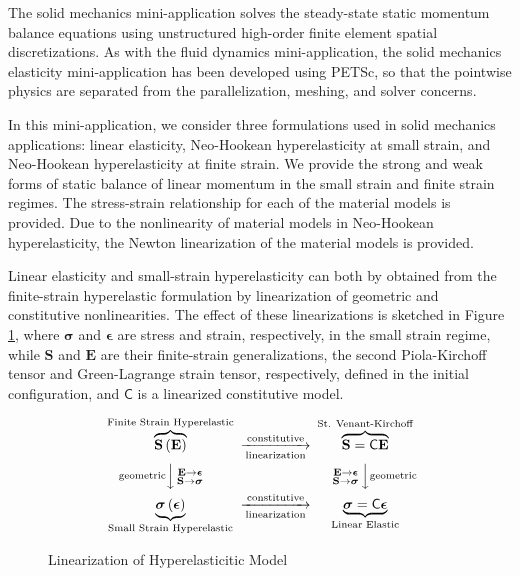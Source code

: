The solid mechanics mini-application solves the steady-state static momentum balance equations using unstructured high-order finite element spatial discretizations.
As with the fluid dynamics mini-application, the solid mechanics elasticity mini-application has been developed using PETSc, so that the pointwise physics are separated from the parallelization, meshing, and solver concerns.

In this mini-application, we consider three formulations used in solid mechanics applications: linear elasticity, Neo-Hookean hyperelasticity at small strain, and Neo-Hookean hyperelasticity at finite strain.
We provide the strong and weak forms of static balance of linear momentum in the small strain and finite strain regimes.
The stress-strain relationship for each of the material models is provided.
Due to the nonlinearity of material models in Neo-Hookean hyperelasticity, the Newton linearization of the material models is provided.

Linear elasticity and small-strain hyperelasticity can both by obtained from the finite-strain hyperelastic formulation by linearization of geometric and constitutive nonlinearities.
The effect of these linearizations is sketched in Figure \ref{fig:hyperelastic-cd}, where $\boldsymbol \sigma$ and $\boldsymbol \epsilon$ are stress and strain, respectively, in the small strain regime, while $\mathbf S$ and $\mathbf E$ are their finite-strain generalizations, the second Piola-Kirchoff tensor and Green-Lagrange strain tensor, respectively, defined in the initial configuration, and $\mathsf C$ is a linearized constitutive model.

\begin{figure}
$$
      \begin{CD}
        {\overbrace{\mathbf S \left( \mathbf E \right)}^{\text{Finite Strain Hyperelastic}}}
        @>{\text{constitutive}}>{\text{linearization}}>
        {\overbrace{\mathbf S = \mathsf C \mathbf E}^{\text{St. Venant-Kirchoff}}} \\
        @V{\text{geometric}}V{\begin{smallmatrix}\mathbf E \to \boldsymbol \epsilon \\ \mathbf S \to \boldsymbol \sigma \end{smallmatrix}}V
        @V{\begin{smallmatrix}\mathbf E \to \boldsymbol \epsilon \\ \mathbf S \to \boldsymbol \sigma \end{smallmatrix}}V{\text{geometric}}V \\
        {\underbrace{\boldsymbol \sigma \left( \boldsymbol \epsilon \right)}_\text{Small Strain Hyperelastic}}
        @>{\text{constitutive}}>\text{linearization}>
        {\underbrace{\boldsymbol \sigma = \mathsf C \boldsymbol \epsilon}_\text{Linear Elastic}}
      \end{CD}
$$
\caption{Linearization of Hyperelasticitic Model}
\label{fig:hyperelastic-cd}
\end{figure}

